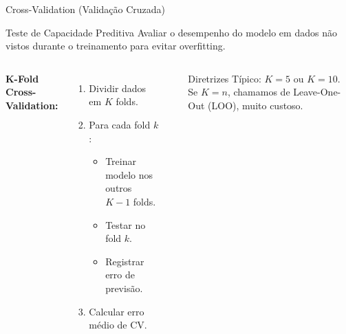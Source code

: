 \begin{frame}{Cross-Validation (Validação Cruzada)}
\begin{block}{Teste de Capacidade Preditiva}
Avaliar o desempenho do modelo em dados não vistos durante o treinamento para evitar overfitting.
\end{block}

\begin{columns}
\textbf{K-Fold Cross-Validation:}
\begin{enumerate}\small
    \item Dividir dados em $K$ folds.
    \item Para cada fold $k$:
    \begin{itemize}
        \item Treinar modelo nos outros $K-1$ folds.
        \item Testar no fold $k$.
        \item Registrar erro de previsão.
    \end{itemize}
    \item Calcular erro médio de CV.
\end{enumerate}

\begin{center}
\end{center}

\begin{block}{Diretrizes}\small
Típico: $K=5$ ou $K=10$. Se $K=n$, chamamos de Leave-One-Out (LOO), muito custoso.
\end{block}
\end{columns}
\end{frame}

